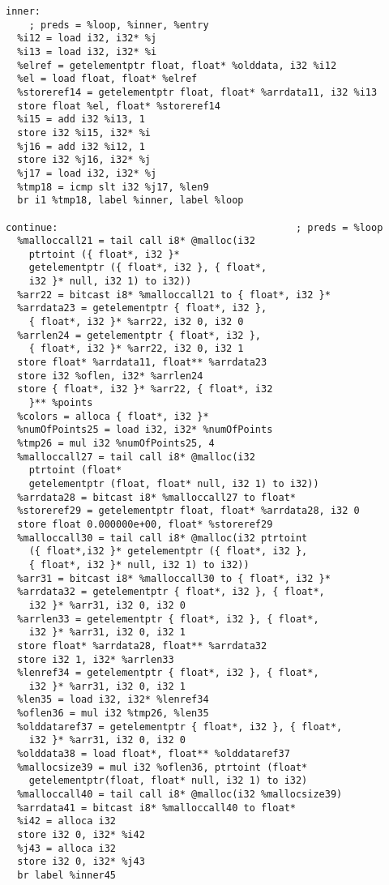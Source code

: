 \documentclass[main.tex]{subfiles}
\begin{document}
{\begin{lstlisting}
inner:                                            
    ; preds = %loop, %inner, %entry
  %i12 = load i32, i32* %j
  %i13 = load i32, i32* %i
  %elref = getelementptr float, float* %olddata, i32 %i12
  %el = load float, float* %elref
  %storeref14 = getelementptr float, float* %arrdata11, i32 %i13
  store float %el, float* %storeref14
  %i15 = add i32 %i13, 1
  store i32 %i15, i32* %i
  %j16 = add i32 %i12, 1
  store i32 %j16, i32* %j
  %j17 = load i32, i32* %j
  %tmp18 = icmp slt i32 %j17, %len9
  br i1 %tmp18, label %inner, label %loop

continue:                                         ; preds = %loop
  %malloccall21 = tail call i8* @malloc(i32 
    ptrtoint ({ float*, i32 }* 
    getelementptr ({ float*, i32 }, { float*, 
    i32 }* null, i32 1) to i32))
  %arr22 = bitcast i8* %malloccall21 to { float*, i32 }*
  %arrdata23 = getelementptr { float*, i32 },
    { float*, i32 }* %arr22, i32 0, i32 0
  %arrlen24 = getelementptr { float*, i32 },
    { float*, i32 }* %arr22, i32 0, i32 1
  store float* %arrdata11, float** %arrdata23
  store i32 %oflen, i32* %arrlen24
  store { float*, i32 }* %arr22, { float*, i32
    }** %points
  %colors = alloca { float*, i32 }*
  %numOfPoints25 = load i32, i32* %numOfPoints
  %tmp26 = mul i32 %numOfPoints25, 4
  %malloccall27 = tail call i8* @malloc(i32
    ptrtoint (float* 
    getelementptr (float, float* null, i32 1) to i32))
  %arrdata28 = bitcast i8* %malloccall27 to float*
  %storeref29 = getelementptr float, float* %arrdata28, i32 0
  store float 0.000000e+00, float* %storeref29
  %malloccall30 = tail call i8* @malloc(i32 ptrtoint
    ({ float*,i32 }* getelementptr ({ float*, i32 },
    { float*, i32 }* null, i32 1) to i32))
  %arr31 = bitcast i8* %malloccall30 to { float*, i32 }*
  %arrdata32 = getelementptr { float*, i32 }, { float*,
    i32 }* %arr31, i32 0, i32 0
  %arrlen33 = getelementptr { float*, i32 }, { float*,
    i32 }* %arr31, i32 0, i32 1
  store float* %arrdata28, float** %arrdata32
  store i32 1, i32* %arrlen33
  %lenref34 = getelementptr { float*, i32 }, { float*,
    i32 }* %arr31, i32 0, i32 1
  %len35 = load i32, i32* %lenref34
  %oflen36 = mul i32 %tmp26, %len35
  %olddataref37 = getelementptr { float*, i32 }, { float*,
    i32 }* %arr31, i32 0, i32 0
  %olddata38 = load float*, float** %olddataref37
  %mallocsize39 = mul i32 %oflen36, ptrtoint (float*
    getelementptr(float, float* null, i32 1) to i32)
  %malloccall40 = tail call i8* @malloc(i32 %mallocsize39)
  %arrdata41 = bitcast i8* %malloccall40 to float*
  %i42 = alloca i32
  store i32 0, i32* %i42
  %j43 = alloca i32
  store i32 0, i32* %j43
  br label %inner45


\end{lstlisting}}
\end{document}
